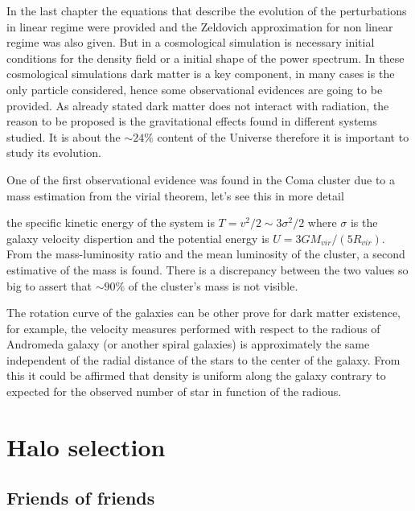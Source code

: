 In the last chapter the equations that describe the evolution of 
the perturbations in linear regime were provided and the Zeldovich 
approximation for non linear regime was also given. But in a cosmological
simulation is necessary initial conditions for the density field
or a initial shape of the power spectrum. In these cosmological simulations 
dark matter is a key component, in many cases is the only particle considered,
hence some observational evidences are going to be provided. As already stated
dark matter does not interact with radiation, the reason to be proposed 
is the gravitational effects found in different systems studied. It is 
about the  $\sim 24\%$ content of the Universe therefore it is important 
to study its evolution. 

One of the first observational evidence was found in the Coma cluster due to
a mass estimation from the virial theorem, let's see this in more detail  

the specific kinetic energy of the system is $T = v^2/2 \sim 3\sigma^2/2 $ 
where $\sigma$ is the galaxy velocity dispertion and the potential energy
is $U = 3GM_{vir}/(5R_{vir})$. From the mass-luminosity ratio and the 
mean luminosity of the cluster, a second estimative of the mass is found. There is
a discrepancy between the two values so big to assert that $\sim 90\%$ of the 
cluster's mass is not visible. 

The rotation curve of the galaxies can be other prove for dark matter existence,
for example, the velocity measures performed with respect to the radious of Andromeda 
galaxy (or another spiral galaxies) is approximately the same independent of the radial
distance of the stars to the center of the galaxy. From this it could be affirmed that
density is uniform along the galaxy contrary to expected for the observed 
number of star in function of the radious. 




\section{ Halo selection }
\subsection{ Friends of friends }
